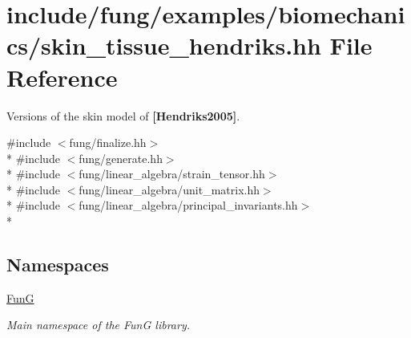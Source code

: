 \hypertarget{skin__tissue__hendriks_8hh}{}\section{include/fung/examples/biomechanics/skin\+\_\+tissue\+\_\+hendriks.hh File Reference}
\label{skin__tissue__hendriks_8hh}


Versions of the skin model of {\bfseries [Hendriks2005]}.  


{\ttfamily \#include $<$fung/finalize.\+hh$>$}\\*
{\ttfamily \#include $<$fung/generate.\+hh$>$}\\*
{\ttfamily \#include $<$fung/linear\+\_\+algebra/strain\+\_\+tensor.\+hh$>$}\\*
{\ttfamily \#include $<$fung/linear\+\_\+algebra/unit\+\_\+matrix.\+hh$>$}\\*
{\ttfamily \#include $<$fung/linear\+\_\+algebra/principal\+\_\+invariants.\+hh$>$}\\*
\subsection*{Namespaces}
\begin{DoxyCompactItemize}
\item 
 \hyperlink{namespaceFunG}{FunG}
\begin{DoxyCompactList}\small\item\em Main namespace of the FunG library. \end{DoxyCompactList}\end{DoxyCompactItemize}
